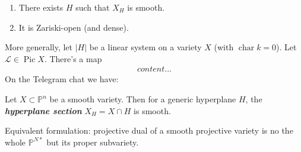 \documentclass{article}
\renewcommand{\P}{\mathbb{P}}
\newcommand{\Lc}{\mathcal{L}}
\DeclareMathOperator{\Pic}{Pic}
\begin{document}
\begin{thm}[Bertini]\leavevmode
	\begin{enumerate}
		\item There exists $H$ such that $X_H$ is smooth.
		\item It is Zariski-open (and dense).
	\end{enumerate}
\end{thm}
More generally, let $|H|$ be a linear system on a variety $X$ (with $\operatorname{char} k=0$). Let $\Lc\in\Pic X$. There's a map
\begin{align*}
	content...
\end{align*}
On the Telegram chat we have:
\begin{thm}[Bertini]
	Let $X\subset\P^n$ be a smooth variety. Then for a generic hyperplane $H$, the \textbf{\textit{hyperplane section}} $X_H=X\cap H$ is smooth.
	
	Equivalent formulation: projective dual of a smooth projective variety is no the whole $\P^{N*}$ but its proper subvariety.
\end{thm}
\end{document}
